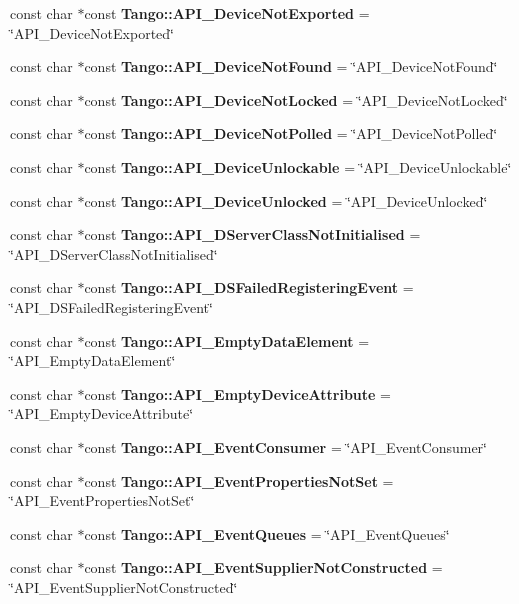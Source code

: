 \begin{DoxyCompactItemize}
\item 
const char $\ast$const {\bf Tango\-::\-A\-P\-I\-\_\-\-Device\-Not\-Exported} = \char`\"{}A\-P\-I\-\_\-\-Device\-Not\-Exported\char`\"{}
\item 
const char $\ast$const {\bf Tango\-::\-A\-P\-I\-\_\-\-Device\-Not\-Found} = \char`\"{}A\-P\-I\-\_\-\-Device\-Not\-Found\char`\"{}
\item 
const char $\ast$const {\bf Tango\-::\-A\-P\-I\-\_\-\-Device\-Not\-Locked} = \char`\"{}A\-P\-I\-\_\-\-Device\-Not\-Locked\char`\"{}
\item 
const char $\ast$const {\bf Tango\-::\-A\-P\-I\-\_\-\-Device\-Not\-Polled} = \char`\"{}A\-P\-I\-\_\-\-Device\-Not\-Polled\char`\"{}
\item 
const char $\ast$const {\bf Tango\-::\-A\-P\-I\-\_\-\-Device\-Unlockable} = \char`\"{}A\-P\-I\-\_\-\-Device\-Unlockable\char`\"{}
\item 
const char $\ast$const {\bf Tango\-::\-A\-P\-I\-\_\-\-Device\-Unlocked} = \char`\"{}A\-P\-I\-\_\-\-Device\-Unlocked\char`\"{}
\item 
const char $\ast$const {\bf Tango\-::\-A\-P\-I\-\_\-\-D\-Server\-Class\-Not\-Initialised} = \char`\"{}A\-P\-I\-\_\-\-D\-Server\-Class\-Not\-Initialised\char`\"{}
\item 
const char $\ast$const {\bf Tango\-::\-A\-P\-I\-\_\-\-D\-S\-Failed\-Registering\-Event} = \char`\"{}A\-P\-I\-\_\-\-D\-S\-Failed\-Registering\-Event\char`\"{}
\item 
const char $\ast$const {\bf Tango\-::\-A\-P\-I\-\_\-\-Empty\-Data\-Element} = \char`\"{}A\-P\-I\-\_\-\-Empty\-Data\-Element\char`\"{}
\item 
const char $\ast$const {\bf Tango\-::\-A\-P\-I\-\_\-\-Empty\-Device\-Attribute} = \char`\"{}A\-P\-I\-\_\-\-Empty\-Device\-Attribute\char`\"{}
\item 
const char $\ast$const {\bf Tango\-::\-A\-P\-I\-\_\-\-Event\-Consumer} = \char`\"{}A\-P\-I\-\_\-\-Event\-Consumer\char`\"{}
\item 
const char $\ast$const {\bf Tango\-::\-A\-P\-I\-\_\-\-Event\-Properties\-Not\-Set} = \char`\"{}A\-P\-I\-\_\-\-Event\-Properties\-Not\-Set\char`\"{}
\item 
const char $\ast$const {\bf Tango\-::\-A\-P\-I\-\_\-\-Event\-Queues} = \char`\"{}A\-P\-I\-\_\-\-Event\-Queues\char`\"{}
\item 
const char $\ast$const {\bf Tango\-::\-A\-P\-I\-\_\-\-Event\-Supplier\-Not\-Constructed} = \char`\"{}A\-P\-I\-\_\-\-Event\-Supplier\-Not\-Constructed\char`\"{}
\item 

\end{DoxyCompactItemize}
